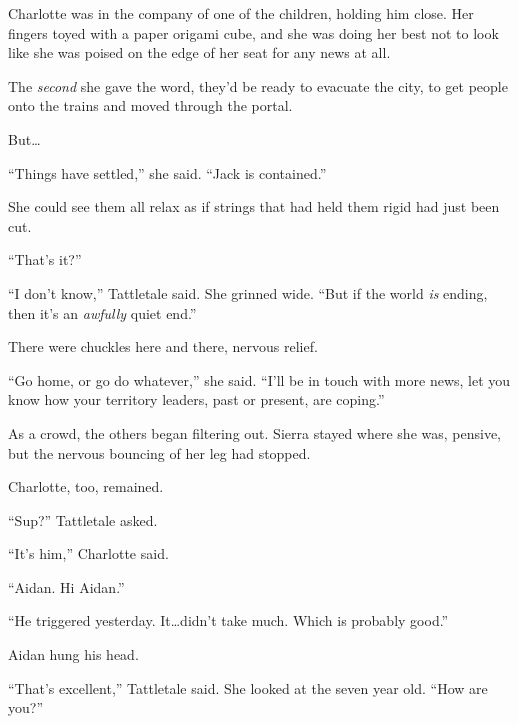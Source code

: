 Charlotte was in the company of one of the children, holding him close.  Her fingers toyed with a paper origami cube, and she was doing her best not to look like she was poised on the edge of her seat for any news at all.



The \emph{second} she gave the word, they'd be ready to evacuate the city, to get people onto the trains and moved through the portal.



But\ldots



``Things have settled,'' she said.  ``Jack is contained.''



She could see them all relax as if strings that had held them rigid had just been cut.



``That's it?''



``I don't know,'' Tattletale said.  She grinned wide.  ``But if the world \emph{is} ending, then it's an \emph{awfully} quiet end.''



There were chuckles here and there, nervous relief.



``Go home, or go do whatever,'' she said.  ``I'll be in touch with more news, let you know how your territory leaders, past or present, are coping.''



As a crowd, the others began filtering out.  Sierra stayed where she was, pensive, but the nervous bouncing of her leg had stopped.



Charlotte, too, remained.



``Sup?'' Tattletale asked.



``It's him,'' Charlotte said.



``Aidan.  Hi Aidan.''



``He triggered yesterday.  It\ldots didn't take much.  Which is probably good.''



Aidan hung his head.



``That's excellent,'' Tattletale said.  She looked at the seven year old.  ``How are you?''



